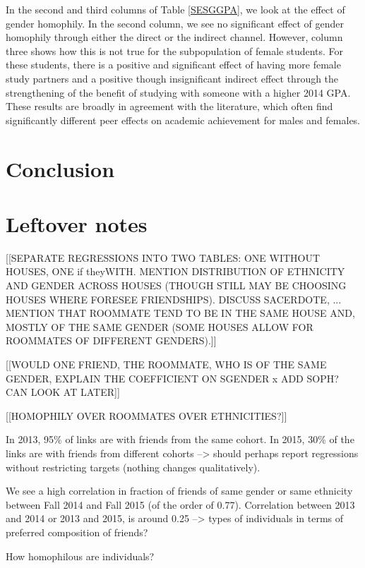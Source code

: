 \documentclass[12pt,letterpaper,english]{article}
\begin{document}
In the second and third columns of Table \ref{SESGGPA}, we look at the effect of gender homophily. In the second column, we see no significant effect of gender homophily through either the direct or the indirect channel. However, column three shows how this is not true for the subpopulation of female students. For these students, there is a positive and significant effect of having more female study partners and a positive though insignificant indirect effect through the strengthening of the benefit of studying with someone with a higher 2014 GPA. These results are broadly in agreement with the literature, which often find significantly different peer effects on academic achievement for males and females.



\section{Conclusion}
\label{sec:conclusion}

\section{Leftover notes}

[[SEPARATE REGRESSIONS INTO TWO TABLES: ONE WITHOUT HOUSES, ONE if theyWITH. MENTION DISTRIBUTION OF ETHNICITY AND GENDER ACROSS HOUSES (THOUGH STILL MAY BE CHOOSING HOUSES WHERE FORESEE FRIENDSHIPS). DISCUSS SACERDOTE, \cite{sacerdote2001peer}... MENTION THAT ROOMMATE TEND TO BE IN THE SAME HOUSE AND, MOSTLY OF THE SAME GENDER (SOME HOUSES ALLOW FOR ROOMMATES OF DIFFERENT GENDERS).]]

[[WOULD ONE FRIEND, THE ROOMMATE, WHO IS OF THE SAME GENDER, EXPLAIN THE COEFFICIENT ON SGENDER x ADD SOPH? CAN LOOK AT LATER]]

[[HOMOPHILY OVER ROOMMATES OVER ETHNICITIES?]]

In 2013, 95\% of links are with friends from the same cohort.
In 2015, 30\% of the links are with friends from different cohorts --> should perhaps report regressions without restricting targets (nothing changes qualitatively).

We see a high correlation in fraction of friends of same gender or same ethnicity between Fall 2014 and Fall 2015 (of the order of 0.77). Correlation between 2013 and 2014 or 2013 and 2015, is around 0.25 --> types of individuals in terms of preferred composition of friends? 

How homophilous are individuals? 
\end{document}
